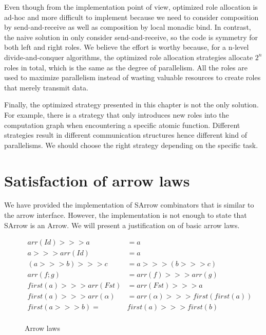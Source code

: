 Even though from the implementation point of view, optimized role allocation is ad-hoc and more difficult to implement because we need to consider composition by send-and-receive as well as composition by local monadic bind. In contrast, the naive solution in  only consider send-and-receive, so the code is symmetry for both left and right roles. We believe the effort is worthy because, for a n-level divide-and-conquer algorithms, the optimized role allocation strategies allocate $2^n$ roles in total, which is the same as the degree of parallelism. All the roles are used to maximize parallelism instead of wasting valuable resources to create roles that merely transmit data.

Finally, the optimized strategy presented in this chapter is not the only solution. For example, there is a strategy that only introduces new roles into the computation graph when encountering a specific atomic function. Different strategies result in different communication structures hence different kind of parallelisms. We should choose the right strategy depending on the specific task.
\section{Satisfaction of arrow laws}
We have provided the implementation of SArrow combinators that is similar to the arrow interface. However, the implementation is not enough to state that SArrow is an Arrow. We will present a justification on of basic arrow laws.
\begin{figure}[ht]
    \begin{align*}
        arr(Id) >>> a &= a \tag{1}\\
        a >>> arr(Id) &= a \tag{2}\\
        (a >>> b) >>> c &= a >>> (b >>> c) \tag{3}\\
        arr(f;g) &= arr(f) >>> arr(g) \tag{4}\\
        first(a) >>> arr(Fst) &= arr(Fst) >>> a \tag{5}\\
        first(a) >>> arr(\alpha) &= arr(\alpha) >>> first(first(a)) \tag{6}\\
        first(a >>> b) =& first(a) >>> first(b) \tag{7}\\
    \end{align*}
    \caption{Arrow laws \cite{atkeyWhatCategoricalModel2011}}
    \label{arrow:tab:law}
\end{figure}

